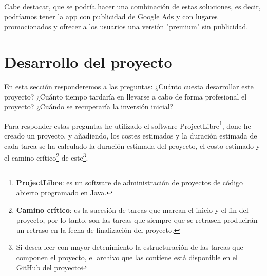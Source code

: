 Cabe destacar, que se podría hacer una combinación de estas soluciones, es decir, podríamos tener la app con publicidad de Google Ads y con lugares promocionados y ofrecer a los usuarios una versión "premium" sin publicidad.

\section{Desarrollo del proyecto}

En esta sección responderemos a las preguntas: ¿Cuánto cuesta desarrollar este proyecto? ¿Cuánto tiempo tardaría en llevarse a cabo de forma profesional el proyecto? ¿Cuándo se recuperaría la inversión inicial?

Para responder estas preguntas he utilizado el software ProjectLibre\footnote{\textbf{ProjectLibre}: es un software de administración de proyectos de código abierto programado en Java.}, done he creado un proyecto, y añadiendo, los costes estimados y la duración estimada de cada tarea se ha calculado la duración estimada del proyecto, el costo estimado y el camino crítico\footnote{\textbf{Camino crítico}: es la sucesión de tareas que marcan el inicio y el fin del proyecto, por lo tanto, son las tareas que siempre que se retrasen producirán un retraso en la fecha de finalización del proyecto.} de este\footnote{Si desea leer con mayor detenimiento la estructuración de las tareas que componen el proyecto, el archivo que las contiene está disponible en el \href{https://github.com/AaronJoseCabreraMartin/TFG-DiscoverTenerife}{GitHub del proyecto}}.


